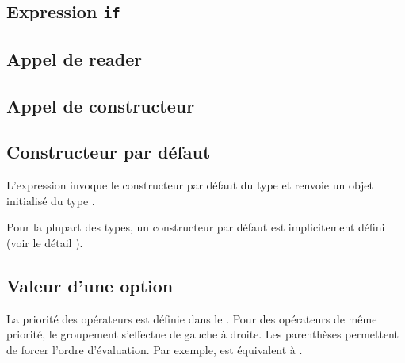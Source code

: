 \subsection{Expression \texttt{if}}

\subsection{Appel de reader}


\subsection{Appel de constructeur}



\subsection{Constructeur par défaut}

L'expression \galgas{[@T default]} invoque le constructeur par défaut du type  et renvoie un objet initialisé du type .

Pour la plupart des types, un constructeur par défaut est implicitement défini (voir le détail ).




\subsection{Valeur d'une option}








La priorité des opérateurs est définie dans le . Pour des opérateurs de même priorité, le groupement s'effectue de gauche à droite. Les parenthèses permettent de forcer l'ordre d'évaluation. Par exemple,  est équivalent à .

